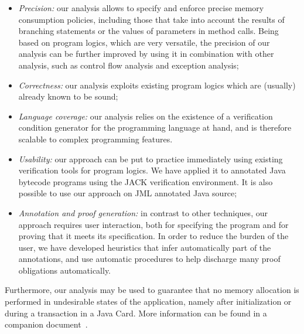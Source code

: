 \begin{itemize}
\item \emph{Precision:} our analysis allows to specify and enforce
precise memory consumption policies, including those that take
into account the results of branching statements or the values of
parameters in method calls. Being based on program logics, which are
very versatile, the precision of our analysis can be further improved
by using it in combination with other analysis, such as control flow
analysis and exception analysis;


\item \emph{Correctness:} our analysis exploits existing program logics
which are (usually) already known to be sound;

\item \emph{Language coverage:} our analysis relies on the existence
of a verification condition generator for the programming language at
hand, and is therefore scalable to complex programming features.


\item \emph{Usability:} our approach can be put to practice
immediately using existing verification tools for program logics. We
have applied it to annotated Java bytecode programs using the JACK
verification environment. It is also
possible to use our approach on JML annotated Java source;




\item \emph{Annotation and proof generation:} in contrast to other
techniques, our approach requires user interaction,
both for specifying the program and for proving that it meets its
specification.  In order to reduce the burden of the user, we have
developed heuristics that infer automatically part of the annotations,
and use automatic procedures to help discharge many proof obligations
automatically.
\end{itemize}
Furthermore, our analysis may be used to guarantee that no memory
allocation is performed in undesirable states of the application,
namely after initialization or during a transaction in a Java Card.
More information can be found in a companion document~\cite{gmg05:sefm}.


